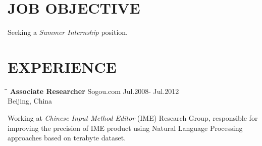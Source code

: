 \documentclass{res}
\begin{document}
 


\address{jianfeng.jia@gmail.com (949) 678-9893}
                                  
\begin{resume}

\section{JOB OBJECTIVE}          
    Seeking a \emph{Summer Internship} position.

\section{EXPERIENCE}
   \vspace{-0.1in}	
   \begin{tabbing}
   \hspace{2.5in}\= \hspace{3in}\= \kill %
    {\bf Associate Researcher} \>Sogou.com     \>Jul.2008- Jul.2012\\
                             \>Beijing, China
   \end{tabbing}\vspace{-20pt}      %
   Working at \emph{Chinese Input Method Editor} (IME) Research Group,
    responsible for improving the precision of IME product using Natural Language Processing approaches based on terabyte dataset. 


\end{resume}
\end{document}
